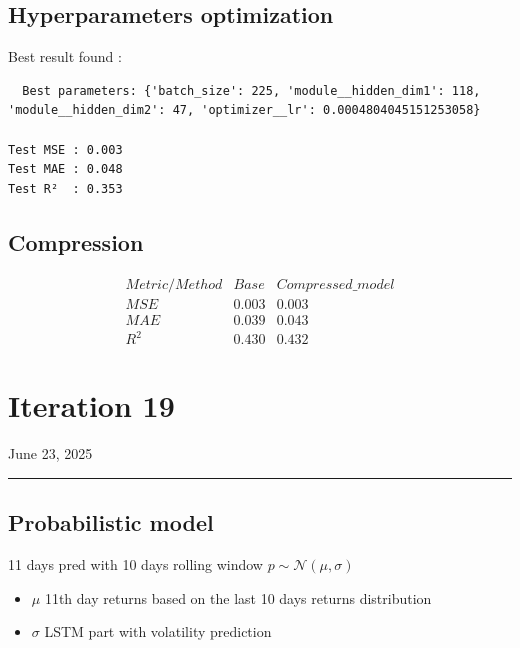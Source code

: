 \documentclass[letterpaper,11pt]{article}
\begin{document}
\subsection*{Hyperparameters optimization}

Best result found :
\begin{verbatim}
  Best parameters: {'batch_size': 225, 'module__hidden_dim1': 118, 'module__hidden_dim2': 47, 'optimizer__lr': 0.0004804045151253058}

Test MSE : 0.003
Test MAE : 0.048
Test R²  : 0.353
\end{verbatim}





\subsection*{Compression}


\[
\begin{array}{ccc}
Metric/Method & Base & Compressed\_model \\
\hline
MSE & 0.003 & 0.003\\
MAE & 0.039 & 0.043 \\
R^{2} & 0.430 & 0.432 
\end{array}
\]
\bigskip









\newpage
\section*{Iteration 19}
\begin{flushright}
June 23, 2025
\end{flushright}
\hrule
\vspace{0.2in}


\subsection*{Probabilistic model}
11 days pred with 10 days rolling window
$p \sim \mathcal{N}(\mu, \sigma)$
\begin{itemize}
  \item $\mu$ 11th day returns based on the last 10 days returns distribution
  \item $\sigma$ LSTM part with volatility prediction
\end{itemize}
\end{document}

